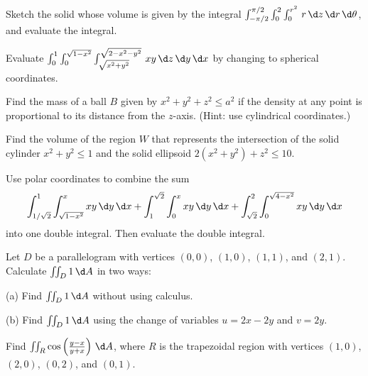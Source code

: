 \documentclass{watsonbook}
\begin{document}
\begin{aexercise}
  Sketch the solid whose volume is given by the integral
  $\int_{-\pi/2}^{\pi/2} \int_0^2 \int_0^{r^2} \, r\,\d z\,\d r\,\d\theta$,
  and evaluate the integral.
\end{aexercise}

\begin{aexercise}
  Evaluate
  $\int_0^1 \int_0^{\sqrt{1-x^2}}
  \int_{\sqrt{x^2+y^2}}^{\sqrt{2-x^2-y^2}} \, xy \, {\d}z \, \d y \, \d x$ by
  changing to spherical coordinates.
\end{aexercise}

\begin{aexercise}
  Find the mass of a ball $B$ given by $x^2+y^2+z^2 \leq a^2$ if the
  density at any point is proportional to its distance from the
  $z$-axis. (Hint: use cylindrical coordinates.)
\end{aexercise}


\begin{aexercise}
  Find the volume of the region $W$ that represents the intersection
  of the solid cylinder $x^2+y^2 \leq 1$ and the solid ellipsoid
  $2(x^2+y^2)+z^2\leq 10.$
\end{aexercise}

\begin{aexercise}
  Use polar coordinates to combine the sum 
  \[
    \int_{1/\sqrt{2}}^1\int_{\sqrt{1-x^2}}^x xy \, \d y \, \d x + 
    \int_{1}^{\sqrt{2}} \int_0^x xy \,\d y \,\d x + 
    \int_{\sqrt{2}}^2 \int_0^{\sqrt{4-x^2}} xy \,\d y \, \d x
  \]
  into one double integral. Then evaluate the double integral.
\end{aexercise}


\begin{aexercise}
  Let $D$ be a parallelogram with vertices $(0,0)$, $(1,0)$, $(1,1)$,
  and $(2,1)$. Calculate $\iint_D 1\,\d A$ in two ways:

  (a) Find $\iint_D 1\,\d A$ without using calculus.

  (b) Find $\iint_D 1\,\d A$ using the change of variables $u = 2x - 2y$
  and $v=2y$.
\end{aexercise}

\begin{aexercise}
  Find
  $\iint_R \cos \left(\frac{y-x}{y+x}\right) \, {\d}A$, where $R$ is the
  trapezoidal region with vertices $(1,0)$, $(2,0)$, $(0,2)$, and
  $(0,1)$.
\end{aexercise}
\end{document}
